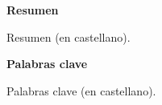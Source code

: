 
\newpage

\thispagestyle{empty}

\begin{center}

{\bf \Huge Resumen}

  \end{center}
\vspace{1cm}

Resumen (en castellano).


\begin{center}

{\bf \Large Palabras clave}

   \end{center}

   \vspace{0.5cm}
   
  Palabras clave (en castellano). 



